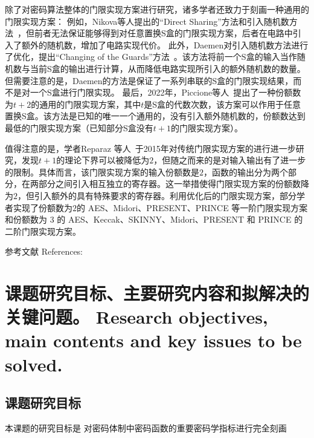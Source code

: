 \documentclass[a4paper,zihao=-4,AutoFakeBold]{ctexart}
\begin{document}
除了对密码算法整体的门限实现方案进行研究，诸多学者还致力于刻画一种通用的门限实现方案：
例如，Nikova等人提出的``Direct Sharing''方法和引入随机数方法~\cite{NikovaRSJoC11}，但前者无法保证能够得到对任意置换S盒的门限实现方案，后者在电路中引入了额外的随机数，增加了电路实现代价。
此外，Daemen对引入随机数方法进行了优化，提出``Changing of the Guards''方法~\cite{DaemenCHES17}。该方法将前一个S盒的输入当作随机数与当前S盒的输出进行计算，从而降低电路实现所引入的额外随机数的数量。但需要注意的是，Daemen的方法是保证了一系列串联的S盒的门限实现结果，而不是对一个S盒进行门限实现。
最后，2022年，Piccione等人~\cite{Piccione23TI_tp2}提出了一种份额数为$t+2$的通用的门限实现方案，其中$t$是S盒的代数次数，该方案可以作用于任意置换S盒。该方法是已知的唯一一个通用的，没有引入额外随机数的，份额数达到最低的门限实现方案（已知部分S盒没有$t+1$的门限实现方案）。

值得注意的是，学者Reparaz 等人~\cite{Reparaz15}于2015年对传统门限实现方案的进行进一步研究，发现$t+1$的理论下界可以被降低为$2$，但随之而来的是对输入输出有了进一步的限制。具体而言，该门限实现方案的输入份额数是$2$，函数的输出分为两个部分，在两部分之间引入相互独立的寄存器。这一举措使得门限实现方案的份额数降为$2$，但引入额外的具有特殊要求的寄存器。利用优化后的门限实现方案，部分学者实现了份额数为$2$的 AES、Midori、PRESENT、PRINCE 等一阶门限实现方案和份额数为 3 的 AES、Keccak、SKINNY、Midori、PRESENT 和 PRINCE 的二阶门限实现方案。

\vspace{2\baselineskip}
{
    \linespread{1.25}\selectfont%
    参考文献 References:
    \printbibliography[heading=none]
}


\section{课题研究目标、主要研究内容和拟解决的关键问题。
  Research objectives, main contents and key issues to be solved.}
\subsection{课题研究目标}
本课题的研究目标是
对密码体制中密码函数的重要密码学指标进行完全刻画
\end{document}
